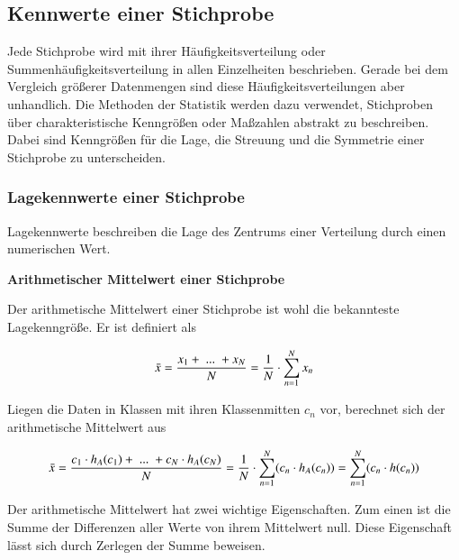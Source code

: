 \clearpage

\subsection{Kennwerte einer Stichprobe}

\noindent Jede Stichprobe wird mit ihrer H\"{a}ufigkeitsverteilung oder Summenh\"{a}ufigkeitsverteilung in allen Einzelheiten beschrieben. Gerade bei dem Vergleich gr\"{o}{\ss}erer Datenmengen sind diese H\"{a}ufigkeitsverteilungen aber unhandlich. Die Methoden der Statistik werden dazu verwendet, Stichproben \"{u}ber charakteristische Kenngr\"{o}{\ss}en oder Ma{\ss}zahlen abstrakt zu beschreiben. Dabei sind Kenngr\"{o}{\ss}en f\"{u}r die Lage, die Streuung und die Symmetrie einer Stichprobe zu unterscheiden. 

\subsubsection{Lagekennwerte einer Stichprobe}\label{threethreeone}

\noindent Lagekennwerte beschreiben die Lage des Zentrums einer Verteilung durch einen numerischen Wert.\bigskip

{\selectfont
\noindent\textbf{Arithmetischer Mittelwert einer Stichprobe}}\smallskip

\noindent Der arithmetische Mittelwert einer Stichprobe ist wohl die bekannteste Lagekenngr\"{o}{\ss}e. Er ist definiert als 

\begin{equation}\label{eq:threefifteen}
\bar{x}=\dfrac{x_{1} +{\rm \; ...\; }+x_{N} }{N} =\dfrac{1}{N} \cdot \sum _{n=1}^{N}x_{n}
\end{equation}

\noindent Liegen die Daten in Klassen mit ihren Klassenmitten $c_{n}$ vor, berechnet sich der arithmetische Mittelwert aus 

\begin{equation}\label{eq:threesixteen}
\bar{x}=\dfrac{c_{1} \cdot h_{A} (c_{1} )+{\rm \; ...\; }+c_{N} \cdot h_{A} (c_{N} )}{N} =\dfrac{1}{N} \cdot \sum _{n=1}^{N}(c_{n} \cdot h_{A} (c_{n})) =\sum _{n=1}^{N}(c_{n} \cdot h(c_{n}))
\end{equation}

Der arithmetische Mittelwert hat zwei wichtige Eigenschaften. Zum einen ist die Summe der Differenzen aller Werte von ihrem Mittelwert null. Diese Eigenschaft l\"{a}sst sich durch Zerlegen der Summe beweisen.

